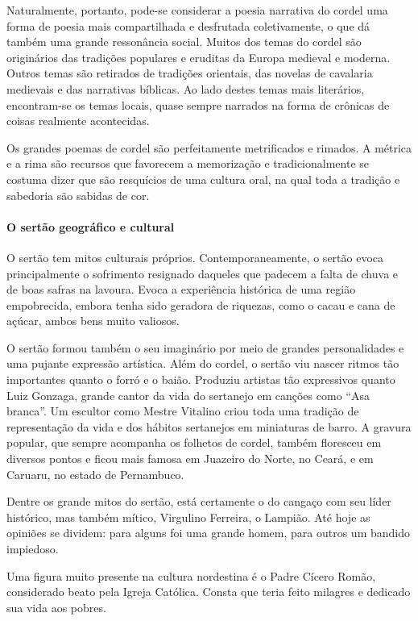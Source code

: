 \documentclass[11pt]{extarticle}
\begin{document}
Naturalmente, portanto, pode-se considerar a poesia narrativa do cordel uma
forma de poesia mais compartilhada e desfrutada coletivamente, o que dá também
uma grande ressonância social. Muitos dos temas do cordel são originários das
tradições populares e eruditas da Europa medieval e moderna. Outros temas são
retirados de tradições orientais, das novelas de cavalaria medievais e das narrativas
bíblicas. Ao lado destes temas mais literários, encontram-se os temas locais,
quase sempre narrados na forma de crônicas de coisas realmente acontecidas.

Os grandes poemas de cordel são perfeitamente metrificados e rimados. A métrica
e a rima são recursos que favorecem a memorização e tradicionalmente se costuma
dizer que são resquícios de uma cultura oral, na qual toda a tradição e
sabedoria são sabidas de cor.  


\paragraph{O sertão geográfico e cultural}

O sertão tem mitos culturais próprios. Contemporaneamente, o sertão evoca
principalmente o sofrimento resignado daqueles que padecem a falta de chuva e
de boas safras na lavoura. Evoca a experiência histórica de uma região
empobrecida, embora tenha sido geradora de riquezas, como o cacau e cana de
açúcar, ambos bens muito valiosos. 

O sertão formou também o seu imaginário por meio de grandes personalidades e
uma pujante expressão artística. Além do cordel, o sertão viu nascer ritmos tão
importantes quanto o forró e o baião. Produziu artistas tão expressivos quanto
Luiz Gonzaga, grande cantor da vida do sertanejo em canções como “Asa branca”.
Um escultor como Mestre Vitalino criou toda uma tradição de representação da
vida e dos hábitos sertanejos em miniaturas de barro. A gravura popular, que
sempre acompanha os folhetos de cordel, também floresceu em diversos pontos e
ficou mais famosa em Juazeiro do Norte, no Ceará, e em Caruaru, no estado de
Pernambuco. 

Dentre os grande mitos do sertão, está certamente o do cangaço com seu líder
histórico, mas também mítico, Virgulino Ferreira, o Lampião. Até hoje as
opiniões se dividem: para alguns foi uma grande homem, para outros um bandido
impiedoso. 

Uma figura muito presente na cultura nordestina é o Padre Cícero Romão,
considerado beato pela Igreja Católica. Consta que teria feito milagres e
dedicado sua vida aos pobres. 
\end{document}

